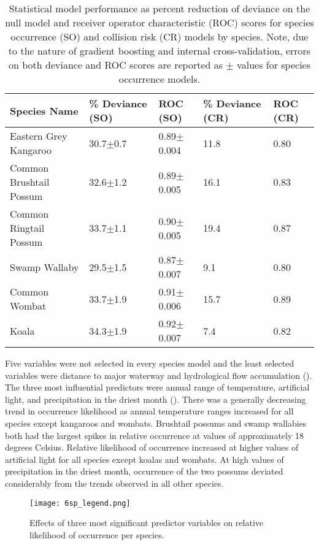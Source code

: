 \begin{table}[!t]
\caption[Statistical model performance for six mammal species]{Statistical model performance as percent reduction of deviance on the null model and receiver operator characteristic (ROC) scores for species occurrence (SO) and collision risk (CR) models by species. Note, due to the nature of gradient boosting and internal cross-validation, errors on both deviance and ROC scores are reported as $\pm$ values for species occurrence models.}
\centering
\begin{tabularx}{0.9\textwidth}{@{}lllll@{}} \toprule
Species Name			&\% Deviance (SO)	&ROC (SO)			&\% Deviance (CR)	&ROC (CR)\\
\midrule 
Eastern Grey Kangaroo	& 30.7$\pm$0.7 		& 0.89$\pm$0.004	& 11.8 				& 0.80 \\ 
Common Brushtail Possum & 32.6$\pm$1.2 		& 0.89$\pm$0.005 	& 16.1 				& 0.83 \\ 
Common Ringtail Possum 	& 33.7$\pm$1.1 		& 0.90$\pm$0.005 	& 19.4 				& 0.87 \\ 
Swamp Wallaby		 	& 29.5$\pm$1.5 		& 0.87$\pm$0.007 	& 9.1 				& 0.80 \\ 
Common Wombat 			& 33.7$\pm$1.9 		& 0.91$\pm$0.006 	& 15.7 				& 0.89 \\ 
Koala 					& 34.3$\pm$1.9 		& 0.92$\pm$0.007 	& 7.4 				& 0.82 \\ 
\bottomrule
\end{tabularx}
\label{6sp_models}
\end{table}

Five variables were not selected in every species model and the least selected variables were distance to major waterway and hydrological flow accumulation (). The three most influential predictors were annual range of temperature, artificial light, and precipitation in the driest month (). There was a generally decreasing trend in occurrence likelihood as annual temperature ranges increased for all species except kangaroos and wombats. Brushtail possums and swamp wallabies both had the largest spikes in relative occurrence at values of approximately 18 degrees Celsius. Relative likelihood of occurrence increased at higher values of artificial light for all species except koalas and wombats. At high values of precipitation in the driest month, occurrence of the two possums deviated considerably from the trends observed in all other species. 

\begin{figure*}[!t]
  \centering
  \texttt{[image: 6sp\_legend.png]}\\
  \caption[Most significant predictor variables on relative likelihood of occurrence for six mammal species]{Effects of three most significant predictor variables on relative likelihood of occurrence per species.}
  \label{6sp_term_occ}
\end{figure*}


